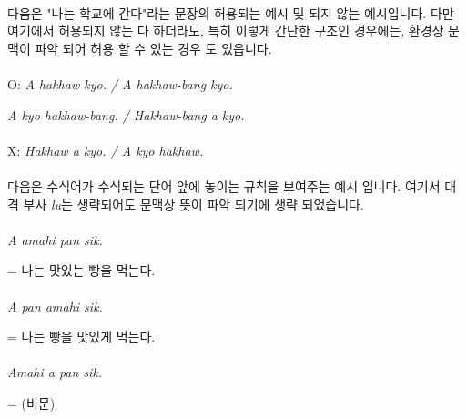 \documentclass{book}
\begin{document}
        \paragraph{}다음은 "나는 학교에 간다"라는 문장의 허용되는 예시 및 되지 않는 예시입니다. 다만 여기에서 허용되지 않는 다 하더라도, 특히 이렇게 간단한 구조인 경우에는, 환경상 문맥이 파악 되어 허용 할 수 있는 경우 도 있읍니다.
        \paragraph{}\hspace{.3in}O: \textit{A hakhaw kyo. / A hakhaw-bang kyo. }
        
        \textit{\hspace{.4in}A kyo hakhaw-bang. / Hakhaw-bang a kyo.}
        
        \paragraph{}\hspace{.3in}X: \textit{Hakhaw a kyo. / A kyo hakhaw.}
        \paragraph{}다음은 수식어가 수식되는 단어 앞에 놓이는 규칙을 보여주는 예시 입니다. 여기서 대격 부사 \textit{lu}는 생략되어도 문맥상 뜻이 파악 되기에 생략 되었습니다. 
        \paragraph{}\hspace{.3in}\textit{A amahi pan sik.}  
        
        \hspace{.4in}= 나는 맛있는 빵을 먹는다. 
        \paragraph{}\hspace{.3in}\textit{A pan amahi sik.}  
        
        \hspace{.4in}= 나는 빵을 맛있게 먹는다.
        \paragraph{}\hspace{.3in}\textit{Amahi a pan sik.}  
        
        \hspace{.4in}= (비문)
        
\end{document}
